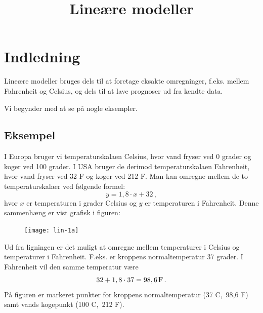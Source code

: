 \documentclass[12pt,oneside,a4paper]{article}
\title{Lineære modeller}
\date{\vspace{-5ex}}
\begin{document}
\maketitle


\section{Indledning}
Lineære modeller bruges dels til at foretage eksakte omregninger, f.eks. mellem
Fahrenheit og Celsius, og dels til at lave prognoser ud fra kendte data.

Vi begynder med at se på nogle eksempler.

\begin{tcolorbox}
\subsection{Eksempel}
I Europa bruger vi temperaturskalaen Celsius, hvor vand fryser ved 0 grader og
koger ved 100 grader.  I USA bruger de derimod temperaturskalaen Fah\-renheit,
hvor vand fryser ved 32 F og koger ved 212 F.
Man kan omregne mellem de to temperaturskalaer ved følgende formel:
\[
    y = 1,8\cdot x  + 32 \,,
\]
hvor $x$ er temperaturen i grader Celsius og $y$ er temperaturen i Fahrenheit.
Denne sammenhæng er vist grafisk i figuren:

\begin{figure}[H]
    \centering
    \texttt{[image: lin-1a]}
    \caption{}
\end{figure}

Ud fra ligningen er det muligt at omregne mellem temperaturer i Celsius og
temperaturer i Fahrenheit. F.eks.  er kroppens normaltemperatur 37 grader. I
Fahrenheit vil den samme temperatur være
\[
    32 + 1,8\cdot 37 = 98,6\, {\rm F} \,.
\]
På figuren er markeret punkter for kroppens normaltemperatur (37 C,\, 98,6 F) samt
vands kogepunkt (100 C,\, 212 F).
\end{tcolorbox}
\end{document}
